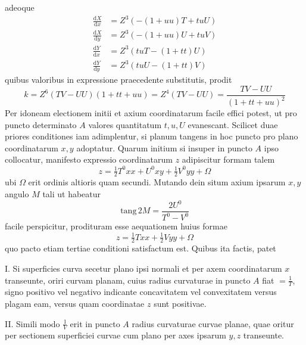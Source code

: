%
adeoque
\[
\begin{aligned}
\frac{\mathrm{d}X}{\mathrm{d}x}&=Z^3(-(1+uu)T+tuU)\\
\frac{\mathrm{d}X}{\mathrm{d}y}&=Z^3(-(1+uu)U+tuV)\\
\frac{\mathrm{d}Y}{\mathrm{d}x}&=Z^3(tuT-(1+tt)U)\\
\frac{\mathrm{d}Y}{\mathrm{d}y}&=Z^3(tuU-(1+tt)V)
\end{aligned}
\]
quibus valoribus in expressione praecedente substitutis, prodit
\[
k=Z^6(TV-UU)(1+tt+uu)=Z^4(TV-UU)=\frac{TV-UU}{(1+tt+uu)^2}
\]
Per idoneam electionem initii et axium coordinatarum facile effici potest, ut pro puncto determinato \(A\) valores quantitatum \(t,u,U\) evanescant. Scilicet duae priores conditiones iam adimplentur, si planum tangens in hoc puncto pro plano coordinatarum \(x,y\) adoptatur. Quarum initium si insuper in puncto \(A\) ipso collocatur, manifesto expressio coordinatarum \(z\) adipiscitur formam talem
\[
z=\tfrac{1}{2}T^0xx+U^0xy+\tfrac{1}{2}V^0yy+\Omega
\]
ubi \(\Omega\) erit ordinis altioris quam secundi. Mutando dein situm axium ipsarum \(x,y\) angulo \(M\) tali ut habeatur
\[
\mathrm{tang}\,2M=\frac{2U^0}{T^0-V^0}
\]
facile perspicitur, prodituram esse aequationem huius formae
\[
z=\tfrac{1}{2}Txx+\tfrac{1}{2}Vyy+\Omega
\]
quo pacto etiam tertiae conditioni satisfactum est. Quibus ita factis, patet

I. Si superficies curva secetur plano ipsi normali et per axem coordinatarum \(x\) transeunte, oriri curvam planam, cuius radius curvaturae in puncto \(A\) fiat \(=\frac{1}{T}\), signo positivo vel negativo indicante concavitatem vel convexitatem versus plagam eam, versus quam coordinatae \(z\) sunt positivae.

II. Simili modo \(\frac{1}{V}\) erit in puncto \(A\) radius curvaturae curvae planae, quae oritur per sectionem superficiei curvae cum plano per axes ipsarum \(y,z\) transeunte.
